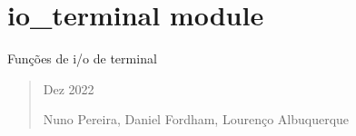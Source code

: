 \documentclass[letterpaper,10pt,portuges]{sphinxmanual}
\begin{document}
\section{io\_terminal module}
\label{\detokenize{io_terminal:module-io_terminal}}\label{\detokenize{io_terminal:io-terminal-module}}\label{\detokenize{io_terminal::doc}}
\sphinxAtStartPar
Funções de i/o de terminal
\begin{quote}\begin{description}
 Dez 2022


\sphinxAtStartPar
Nuno Pereira, Daniel Fordham, Lourenço Albuquerque

\end{description}\end{quote}
\end{document}
